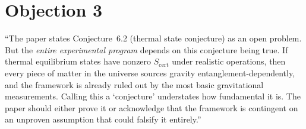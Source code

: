 \documentclass[11pt,letterpaper]{article}
\newcommand{\Scert}{S_{\mathrm{cert}}}
\begin{document}
\section*{Objection 3}

\begin{tcolorbox}[breakable,enhanced,colback=red!3,colframe=red!60!black,
  fonttitle=\bfseries,title={Referee Objection 3: OP-new is not a conjecture, it is an assumption},
  boxrule=0.8pt]
``The paper states Conjecture~6.2 (thermal state conjecture) as an open problem.  But
the \emph{entire experimental program} depends on this conjecture being true.  If thermal
equilibrium states have nonzero $\Scert$ under realistic operations, then every piece of
matter in the universe sources gravity entanglement-dependently, and the framework is
already ruled out by the most basic gravitational measurements.  Calling this a `conjecture'
understates how fundamental it is.  The paper should either prove it or acknowledge that
the framework is contingent on an unproven assumption that could falsify it entirely.''
\end{tcolorbox}
\end{document}
